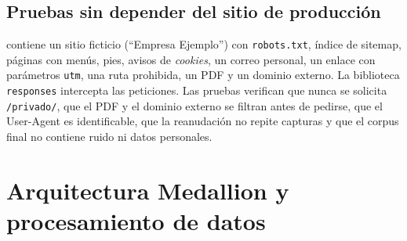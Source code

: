 \section{Pruebas sin depender del sitio de producción}
 contiene un sitio ficticio (``Empresa Ejemplo'') con \texttt{robots.txt}, índice de
sitemap, páginas con menús, pies, avisos de \emph{cookies}, un correo personal, un enlace con parámetros
\texttt{utm}, una ruta prohibida, un PDF y un dominio externo. La biblioteca \texttt{responses} intercepta las
peticiones. Las pruebas verifican que nunca se solicita \texttt{/privado/}, que el PDF y el dominio externo se
filtran antes de pedirse, que el User-Agent es identificable, que la reanudación no repite capturas y que el
corpus final no contiene ruido ni datos personales.

\chapter{Arquitectura Medallion y procesamiento de datos}\label{cap:medallion}

